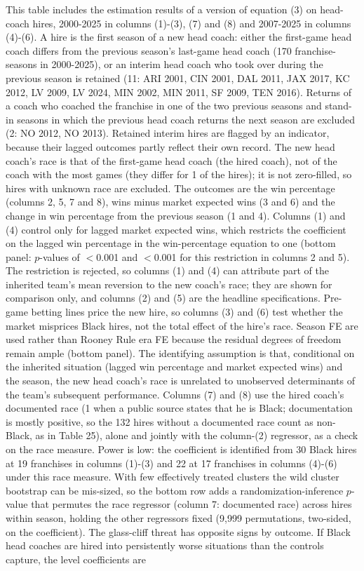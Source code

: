 \begin{table}[!h]
{\begin{threeparttable}
\begin{tablenotes}[para]
\item This table includes the estimation results of a version of equation (3) on head-coach hires, 2000-2025 in columns (1)-(3), (7) and (8) and 2007-2025 in columns (4)-(6). A hire is the first season of a new head coach: either the first-game head coach differs from the previous season's last-game head coach (170 franchise-seasons in 2000-2025), or an interim head coach who took over during the previous season is retained (11: ARI 2001, CIN 2001, DAL 2011, JAX 2017, KC 2012, LV 2009, LV 2024, MIN 2002, MIN 2011, SF 2009, TEN 2016). Returns of a coach who coached the franchise in one of the two previous seasons and stand-in seasons in which the previous head coach returns the next season are excluded (2: NO 2012, NO 2013). Retained interim hires are flagged by an indicator, because their lagged outcomes partly reflect their own record. The new head coach's race is that of the first-game head coach (the hired coach), not of the coach with the most games (they differ for 1 of the hires); it is not zero-filled, so hires with unknown race are excluded. The outcomes are the win percentage (columns 2, 5, 7 and 8), wins minus market expected wins (3 and 6) and the change in win percentage from the previous season (1 and 4). Columns (1) and (4) control only for lagged market expected wins, which restricts the coefficient on the lagged win percentage in the win-percentage equation to one (bottom panel: $p$-values of $<$0.001 and $<$0.001 for this restriction in columns 2 and 5). The restriction is rejected, so columns (1) and (4) can attribute part of the inherited team's mean reversion to the new coach's race; they are shown for comparison only, and columns (2) and (5) are the headline specifications. Pre-game betting lines price the new hire, so columns (3) and (6) test whether the market misprices Black hires, not the total effect of the hire's race. Season FE are used rather than Rooney Rule era FE because the residual degrees of freedom remain ample (bottom panel). The identifying assumption is that, conditional on the inherited situation (lagged win percentage and market expected wins) and the season, the new head coach's race is unrelated to unobserved determinants of the team's subsequent performance. Columns (7) and (8) use the hired coach's documented race (1 when a public source states that he is Black; documentation is mostly positive, so the 132 hires without a documented race count as non-Black, as in Table 25), alone and jointly with the column-(2) regressor, as a check on the race measure. Power is low: the coefficient is identified from 30 Black hires at 19 franchises in columns (1)-(3) and 22 at 17 franchises in columns (4)-(6) under this race measure. With few effectively treated clusters the wild cluster bootstrap can be mis-sized, so the bottom row adds a randomization-inference $p$-value that permutes the race regressor (column 7: documented race) across hires within season, holding the other regressors fixed (9,999 permutations, two-sided, on the coefficient). The glass-cliff threat has opposite signs by outcome. If Black head coaches are hired into persistently worse situations than the controls capture, the level coefficients are 
\end{tablenotes}
\end{threeparttable}}
\end{table}
